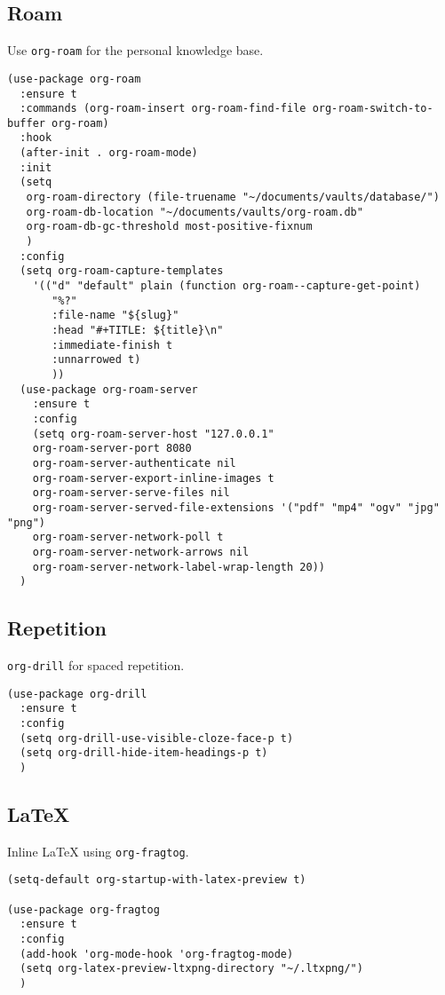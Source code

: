 \documentclass[11pt]{article}
\begin{document}
\subsection{Roam}
\label{sec:org1499180}
Use \texttt{org-roam} for the personal knowledge base.
\begin{verbatim}
(use-package org-roam
  :ensure t
  :commands (org-roam-insert org-roam-find-file org-roam-switch-to-buffer org-roam)
  :hook
  (after-init . org-roam-mode)
  :init
  (setq
   org-roam-directory (file-truename "~/documents/vaults/database/")
   org-roam-db-location "~/documents/vaults/org-roam.db"
   org-roam-db-gc-threshold most-positive-fixnum
   )
  :config
  (setq org-roam-capture-templates
	'(("d" "default" plain (function org-roam--capture-get-point)
	   "%?"
	   :file-name "${slug}"
	   :head "#+TITLE: ${title}\n"
	   :immediate-finish t
	   :unnarrowed t)
	   ))
  (use-package org-roam-server
    :ensure t
    :config
    (setq org-roam-server-host "127.0.0.1"
	org-roam-server-port 8080
	org-roam-server-authenticate nil
	org-roam-server-export-inline-images t
	org-roam-server-serve-files nil
	org-roam-server-served-file-extensions '("pdf" "mp4" "ogv" "jpg" "png")
	org-roam-server-network-poll t
	org-roam-server-network-arrows nil
	org-roam-server-network-label-wrap-length 20))
  )
\end{verbatim}
\subsection{Repetition}
\label{sec:org1ee25ca}
\texttt{org-drill} for spaced repetition.
\begin{verbatim}
(use-package org-drill
  :ensure t
  :config
  (setq org-drill-use-visible-cloze-face-p t)
  (setq org-drill-hide-item-headings-p t)
  )
\end{verbatim}
\subsection{\LaTeX{}}
\label{sec:orgf347bfb}
Inline \LaTeX{} using \texttt{org-fragtog}.
\begin{verbatim}
(setq-default org-startup-with-latex-preview t)

(use-package org-fragtog
  :ensure t
  :config
  (add-hook 'org-mode-hook 'org-fragtog-mode)
  (setq org-latex-preview-ltxpng-directory "~/.ltxpng/")
  )
\end{verbatim}
\end{document}
